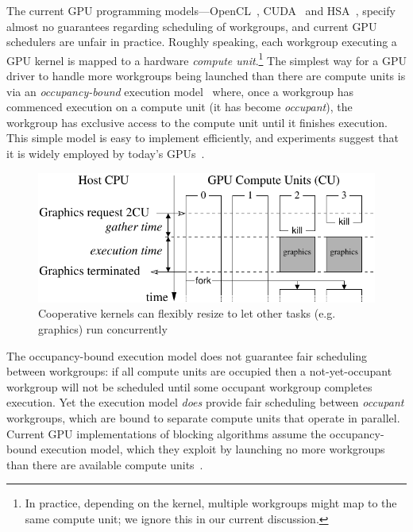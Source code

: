 \documentclass[sigconf]{acmart}
\begin{document}
 The current GPU programming
models---OpenCL~\cite{opencl2Spec}, CUDA~\cite{cuda-75} and
HSA~\cite{HSAprogramming11}, specify almost no guarantees regarding
scheduling of workgroups, and current GPU schedulers are unfair in
practice.  Roughly speaking, each workgroup executing a GPU kernel is
mapped to a hardware \emph{compute unit}.\footnote{In practice,
  depending on the kernel, multiple workgroups might map to the same
  compute unit; we ignore this in our current discussion.}
%
The simplest way for a GPU driver to handle more workgroups being
launched than there are compute units is via an \emph{occupancy-bound}
execution
model~\cite{owens-persistent,DBLP:conf/oopsla/SorensenDBGR16} where,
once a workgroup has commenced execution on a compute unit (it has
become \emph{occupant}), the workgroup has exclusive access to the
compute unit until it finishes execution.
This simple model is easy to implement
efficiently, and experiments suggest that
it is widely employed by today's
GPUs~\cite{owens-persistent,DBLP:conf/oopsla/SorensenDBGR16,DBLP:conf/oopsla/PaiP16,BNP12}.


\begin{figure}[t]
\centering
\includegraphics[width=\columnwidth]{overview.pdf}
\caption{Cooperative kernels can flexibly resize to let other tasks
(e.g. graphics) run concurrently}
\label{fig:overview}
\end{figure}

The occupancy-bound execution model does not guarantee fair scheduling
between workgroups: if all compute units are occupied then a
not-yet-occupant workgroup will not be scheduled until some occupant
workgroup completes execution.  Yet the execution model \emph{does}
provide fair scheduling between \emph{occupant} workgroups, which are
bound to separate compute units that operate in parallel.  Current GPU
implementations of blocking algorithms assume the occupancy-bound
execution model, which they exploit by launching no more workgroups
than there are available compute units~\cite{owens-persistent}.
\end{document}
